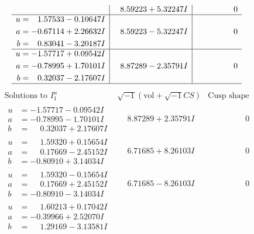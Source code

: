 \documentclass[1p]{elsarticle_modified}
\theoremstyle{definition}
\newcommand{\I}{\sqrt{-1}}
\begin{document}
$$\begin{array}{c|c|c}
 & \phantom{-}8.59223 + 5.32247 I & \phantom{-0.000000 } 0 \\ \hline\begin{aligned}
u &= \phantom{-}1.57533 - 0.10647 I \\
a &= -0.67114 + 2.26632 I \\
b &= \phantom{-}0.83041 - 3.20187 I\end{aligned}
 & \phantom{-}8.59223 - 5.32247 I & \phantom{-0.000000 } 0 \\ \hline\begin{aligned}
u &= -1.57717 + 0.09542 I \\
a &= -0.78995 + 1.70101 I \\
b &= \phantom{-}0.32037 - 2.17607 I\end{aligned}
 & \phantom{-}8.87289 - 2.35791 I & \phantom{-0.000000 } 0\\
 \hline 
 \end{array}$$\newpage$$\begin{array}{c|c|c}  
\text{Solutions to }I^u_{1}& \I (\text{vol} + \sqrt{-1}CS) & \text{Cusp shape}\\
 \hline 
\begin{aligned}
u &= -1.57717 - 0.09542 I \\
a &= -0.78995 - 1.70101 I \\
b &= \phantom{-}0.32037 + 2.17607 I\end{aligned}
 & \phantom{-}8.87289 + 2.35791 I & \phantom{-0.000000 } 0 \\ \hline\begin{aligned}
u &= \phantom{-}1.59320 + 0.15654 I \\
a &= \phantom{-}0.17669 - 2.45152 I \\
b &= -0.80910 + 3.14034 I\end{aligned}
 & \phantom{-}6.71685 + 8.26103 I & \phantom{-0.000000 } 0 \\ \hline\begin{aligned}
u &= \phantom{-}1.59320 - 0.15654 I \\
a &= \phantom{-}0.17669 + 2.45152 I \\
b &= -0.80910 - 3.14034 I\end{aligned}
 & \phantom{-}6.71685 - 8.26103 I & \phantom{-0.000000 } 0 \\ \hline\begin{aligned}
u &= \phantom{-}1.60213 + 0.17042 I \\
a &= -0.39966 + 2.52070 I \\
b &= \phantom{-}1.29169 - 3.13581 I\end{aligned}

\end{array}$$
\end{document}
